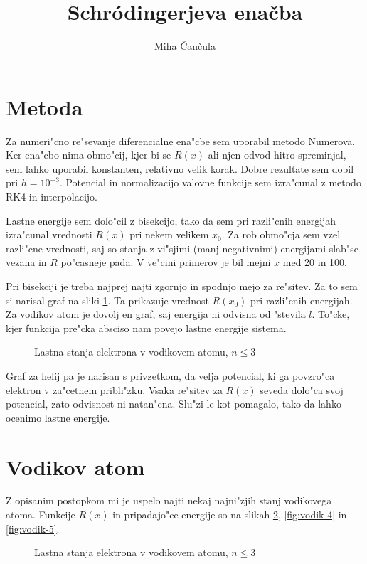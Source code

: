 \documentclass[a4paper,10pt]{article}
\title{Schr\' odingerjeva ena\v cba}
\author{Miha \v Can\v cula}
\begin{document}
\maketitle

\section{Metoda}

Za numeri"cno re"sevanje diferencialne ena"cbe sem uporabil metodo Numerova. Ker ena"cbo nima obmo"cij, kjer bi se $R(x)$ ali njen odvod hitro spreminjal, sem lahko uporabil konstanten, relativno velik korak. Dobre rezultate sem dobil pri $h=10^{-3}$. Potencial in normalizacijo valovne funkcije sem izra"cunal z metodo RK4 in interpolacijo. 

Lastne energije sem dolo"cil z bisekcijo, tako da sem pri razli"cnih energijah izra"cunal vrednosti $R(x)$ pri nekem velikem $x_0$. Za rob obmo"cja sem vzel razli"cne vrednosti, saj so stanja z vi"sjimi (manj negativnimi) energijami slab"se vezana in $R$ po"casneje pada. V ve"cini primerov je bil mejni $x$ med 20 in 100. 

Pri bisekciji je treba najprej najti zgornjo in spodnjo mejo za re"sitev. Za to sem si narisal graf na sliki \ref{fig:spekter}. Ta prikazuje vrednost $R(x_0)$ pri razli"cnih energijah. Za vodikov atom je dovolj en graf, saj energija ni odvisna od "stevila $l$. To"cke, kjer funkcija pre"cka absciso nam povejo lastne energije sistema. 

\begin{figure}[H]
 
 \caption{Lastna stanja elektrona v vodikovem atomu, $n \leq 3$}
 \label{fig:spekter}
\end{figure}

Graf za helij pa je narisan s privzetkom, da velja potencial, ki ga povzro"ca elektron v za"cetnem pribli"zku. Vsaka re"sitev za $R(x)$ seveda dolo"ca svoj potencial, zato odvisnost ni natan"cna. Slu"zi le kot pomagalo, tako da lahko ocenimo lastne energije. 

\section{Vodikov atom}

Z opisanim postopkom mi je uspelo najti nekaj najni"zjih stanj vodikovega atoma. Funkcije $R(x)$ in pripadajo"ce energije so na slikah \ref{fig:vodik-123}, \ref{fig:vodik-4} in \ref{fig:vodik-5}. 

\begin{figure}[H]
 
 \caption{Lastna stanja elektrona v vodikovem atomu, $n \leq 3$}
 \label{fig:vodik-123}
\end{figure}
\end{document}

